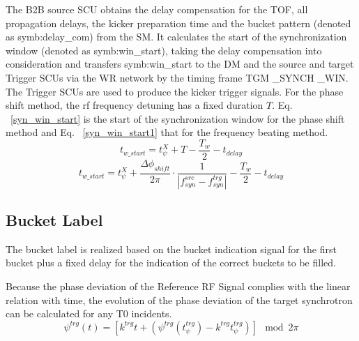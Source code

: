 The B2B source SCU obtains the delay compensation for the TOF, all propagation delays, the kicker preparation time and the bucket pattern (denoted as \gls{symb:delay_com}) from the SM. It calculates the start of the synchronization window (denoted as \gls{symb:win_start}), taking the delay compensation into consideration and transfers \gls{symb:win_start} to the DM and the source and target Trigger SCUs via the WR network by the timing frame TGM \_SYNCH \_WIN. The Trigger SCUs are used to produce the kicker trigger signals. For the phase shift method, the rf frequency detuning has a fixed duration $T$. Eq. ~\ref{syn_win_start} is the start of the synchronization window for the phase shift method and Eq. ~\ref{syn_win_start1} that for the frequency beating method.
\begin{equation}
t_\mathit{w\_start}=t_\psi^\mathit{X}+T-\frac{T_w}{2}-t_\mathit{delay}\label{syn_win_start}
\end{equation}
\begin{equation}
t_\mathit{w\_start}= t_\psi^\mathit{X}+\frac{\Delta \phi_\mathit{shift}}{2\pi}\cdot\frac{1}{|f_{\mathit{syn}}^\mathit{src}-f_{\mathit{syn}}^\mathit{trg}|}-\frac{T_w}{2}-t_\mathit{delay}\label{syn_win_start1}
\end{equation}

\subsection{Bucket Label}
\label{sec:bucket_label}
The bucket label is realized based on the bucket indication signal for the first bucket plus a fixed delay for the indication of the correct buckets to be filled. 

Because the phase deviation of the Reference RF Signal complies with the linear relation with time, the evolution of the phase deviation of the target synchrotron can be calculated for any T0 incidents. 
\begin{equation}
\psi^\mathit{trg}(t)= [k^\mathit{trg}t+(\psi^\mathit{trg}(t_\mathit{\psi}^\mathit{trg})-k^\mathit{trg}t_\mathit{\psi}^\mathit{trg})] \mod 2\pi
\end{equation}

